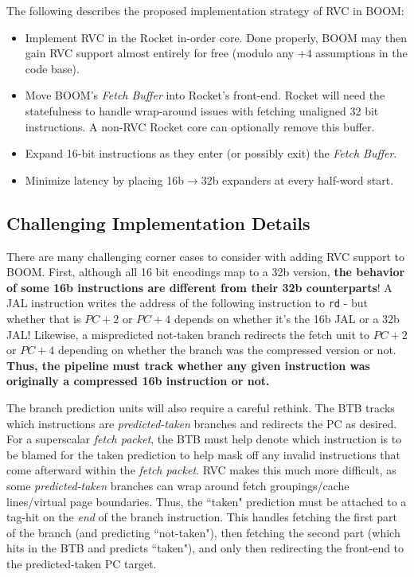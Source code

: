 The following describes the proposed implementation strategy of RVC in BOOM:

\begin{itemize}
\item Implement RVC in the Rocket in-order core.  Done properly, BOOM may then gain RVC support almost entirely for free (modulo any $+4$ assumptions in the code base).
\item Move BOOM's {\em Fetch Buffer} into Rocket's front-end. Rocket will need the statefulness to handle wrap-around issues with fetching unaligned 32 bit instructions.  A non-RVC Rocket core can optionally remove this buffer. 
\item Expand 16-bit instructions as they enter (or possibly exit) the {\em Fetch Buffer}. 
\item Minimize latency by placing 16b$\rightarrow$32b expanders at every half-word start. 
\end{itemize}

\subsection{Challenging Implementation Details}

There are many challenging corner cases to consider with adding RVC support to BOOM. First, although all 16 bit encodings map to a 32b version, {\bf the behavior of some 16b instructions are different from their 32b counterparts}!  A JAL instruction writes the address of the following instruction to {\tt rd} - but whether that is $PC+2$ or $PC+4$ depends on whether it's the 16b JAL or a 32b JAL!  Likewise, a mispredicted not-taken branch redirects the fetch unit to $PC+2$ or $PC+4$ depending on whether the branch was the compressed version or not. {\bf Thus, the pipeline must track whether any given instruction was originally a compressed 16b instruction or not.}

The branch prediction units will also require a careful rethink. The BTB tracks which instructions are {\em predicted-taken} branches and redirects the PC as desired. For a superscalar {\em fetch packet}, the BTB must help denote which instruction is to be blamed for the taken prediction to help mask off any invalid instructions that come afterward within the {\em fetch packet}. RVC makes this much more difficult, as some {\em predicted-taken} branches can wrap around fetch groupings/cache lines/virtual page boundaries. Thus, the ``taken" prediction must be attached to a tag-hit on the {\em end} of the branch instruction.  This handles fetching the first part of the branch (and predicting ``not-taken"), then fetching the second part (which hits in the BTB and predicts ``taken"), and only then redirecting the front-end to the predicted-taken PC target. 

